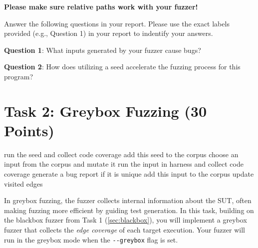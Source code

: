 \documentclass[letterpaper,11pt]{article}
\begin{document}
\textbf{Please make sure relative paths work with your fuzzer!}




Answer the following questions in your report. Please use the exact labels provided (e.g., Question 1) in your report to indentify your answers.

\textbf{Question 1}: What inputs generated by your fuzzer cause bugs?

\textbf{Question 2}: How does utilizing a seed accelerate the fuzzing process for this program?



\section{Task 2: Greybox Fuzzing (30 Points)}
\label{sec:greybox}

\begin{algorithm}
\caption{Greybox fuzzer algorithm}
\begin{algorithmic}
\label{alg:greybox}
\STATE run the seed and collect code coverage
    \STATE add this seed to the corpus
\ENDIF
\ENDFOR
{}
\STATE choose an input from the corpus and mutate it
\STATE run the input in harness and collect code coverage
    \STATE generate a bug report if it is unique
\ENDIF
{}
        \STATE add this input to the corpus
    \ENDIF
    \STATE update visited edges
\ENDIF
\ENDWHILE
\end{algorithmic}
\end{algorithm}

In greybox fuzzing, the fuzzer collects internal information about the SUT, often making fuzzing more efficient by guiding test generation.
In this task, building on the blackbox fuzzer from Task 1 (\autoref{sec:blackbox}), you will implement a greybox fuzzer that collects the \textit{edge coverage} of each target execution.
Your fuzzer will run in the greybox mode when the \texttt{{-}{-}greybox} flag is set.
\end{document}
